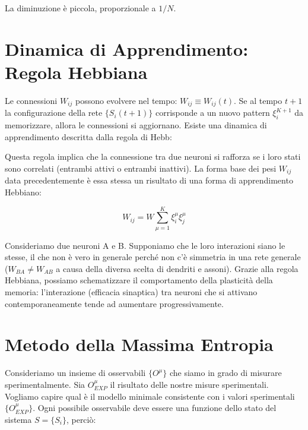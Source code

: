 La diminuzione è piccola, proporzionale a $1/N$.


\section{Dinamica di Apprendimento: Regola Hebbiana}
Le connessioni $W_{ij}$ possono evolvere nel tempo: $W_{ij} \equiv W_{ij}(t)$.
Se al tempo $t+1$ la configurazione della rete $\{S_i(t+1)\}$ corrisponde a un nuovo pattern $\xi_i^{K+1}$ da memorizzare, allora le connessioni si aggiornano.
Esiste una dinamica di apprendimento descritta dalla regola di Hebb:

\vspace{0.5cm}
\noindent{}
\vspace{0.5cm}

Questa regola implica che la connessione tra due neuroni si rafforza se i loro stati sono correlati (entrambi attivi o entrambi inattivi). La forma base dei pesi $W_{ij}$ data precedentemente è essa stessa un risultato di una forma di apprendimento Hebbiano:

\begin{equation} \label{eq:ch22_10}
W_{ij} = W\sum_{\mu=1}^{K} \xi_i^\mu \xi_j^\mu
\end{equation}

Consideriamo due neuroni A e B. Supponiamo che le loro interazioni siano le stesse, il che non è vero in generale perché non c'è simmetria in una rete generale ($W_{BA} \neq W_{AB}$ a causa della diversa scelta di dendriti e assoni).
Grazie alla regola Hebbiana, possiamo schematizzare il comportamento della plasticità della memoria: l'interazione (efficacia sinaptica) tra neuroni che si attivano contemporaneamente tende ad aumentare progressivamente.


\section{Metodo della Massima Entropia}
Consideriamo un insieme di osservabili $\{O^\mu\}$ che siamo in grado di misurare sperimentalmente.
Sia $O_{EXP}^\mu$ il risultato delle nostre misure sperimentali.
Vogliamo capire qual è il modello minimale consistente con i valori sperimentali $\{O_{EXP}^\mu\}$.
Ogni possibile osservabile deve essere una funzione dello stato del sistema $S = \{S_i\}$, perciò:

